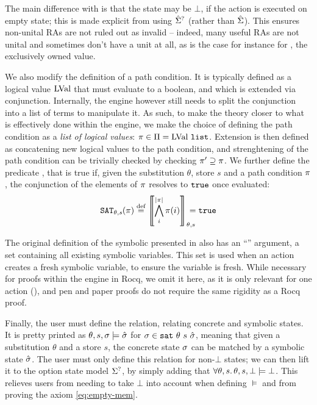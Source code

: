 The main difference with \cite{cse2} is that the state may be $\bot$, if the action is executed on empty state; this is made explicit from using $\hat{\Sigma}^?$ (rather than $\hat{\Sigma}$). This ensures non-unital RAs are not ruled out as invalid -- indeed, many useful RAs are not unital and sometimes don't have a unit at all, as is the case for instance for \Ex, the exclusively owned value. 

We also modify the definition of a path condition. It is typically defined as a logical value $\text{LVal}$ that must evaluate to a boolean, and which is extended via conjunction. Internally, the engine however still needs to split the conjunction into a list of terms to manipulate it. As such, to make the theory closer to what is effectively done within the engine, we make the choice of defining the path condition as a \emph{list of logical values}: $\pi\in\Pi=\text{LVal}~\texttt{list}$. Extension is then defined as concatening new logical values to the path condition, and strenghtening of the path condition can be trivially checked by checking $\pi'\supseteq\pi$. We further define the predicate , that is true if, given the substitution $\theta$, store $s$ and a path condition $\pi$, the conjunction of the elements of $\pi$ resolves to $\texttt{true}$ once evaluated:
\begin{align*}
	\texttt{SAT}_{\mathit{\theta,s}}(\pi) \stackrel{\textnormal{def}}= \left\llbracket \bigwedge_{i}^{|\pi|}\pi(i) \right\rrbracket_{\theta,s} \hspace{-1em} = \texttt{true}
\end{align*}

The original definition of the symbolic \execac{} presented in \cite{cse2} also has an ``\SV'' argument, a set containing all existing symbolic variables. This set is used when an action creates a fresh symbolic variable, to ensure the variable is fresh. While necessary for proofs within the engine in Rocq, we omit it here, as it is only relevant for one action (\alloc), and pen and paper proofs do not require the same rigidity as a Rocq proof. 

Finally, the user must define the  relation, relating concrete and symbolic states. It is pretty printed as $\theta,s,\sigma\models \hat{\sigma}$ for $\sigma\in\texttt{sat}~\theta~s~\hat{\sigma}$, meaning that given a substitution $\theta$ and a store $s$, the concrete state $\sigma$ can be matched by a symbolic state $\hat{\sigma}$. The user must only define this relation for non-$\bot$ states; we can then lift it to the option state model $\Sigma^?$, by simply adding that $\forall \theta, s\ldotp \theta,s,\bot \models \bot$. This relieves users from needing to take $\bot$ into account when defining $\models$ and from proving the axiom \ref{eq:empty-mem}.

